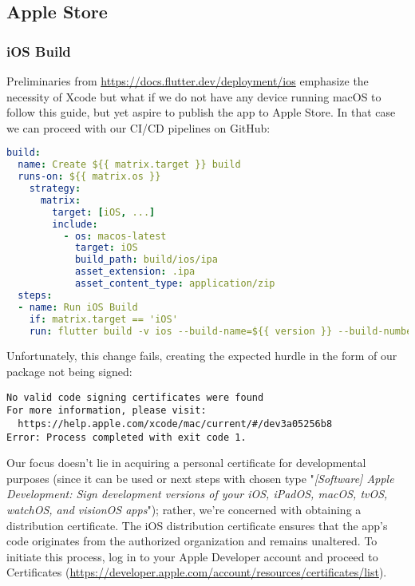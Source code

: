 
\subsection{Apple Store}

\subsubsection{iOS Build}

Preliminaries from \href{https://docs.flutter.dev/deployment/ios}{https://docs.flutter.dev/deployment/ios} emphasize 
the necessity of Xcode but what if we do not have any device running macOS to follow this guide, but yet aspire to 
publish the app to Apple Store. In that case we can proceed with our CI/CD pipelines on GitHub:

\begin{lstlisting}[language=yaml]
build:
  name: Create ${{ matrix.target }} build
  runs-on: ${{ matrix.os }}
    strategy:
      matrix:
        target: [iOS, ...]
        include:
          - os: macos-latest
            target: iOS
            build_path: build/ios/ipa
            asset_extension: .ipa
            asset_content_type: application/zip
  steps:
  - name: Run iOS Build
    if: matrix.target == 'iOS'
    run: flutter build -v ios --build-name=${{ version }} --build-number=${{ number }} --release --no-tree-shake-icons
\end{lstlisting}

\noindent Unfortunately, this change fails, creating the expected hurdle in the form of our package not being signed:

\begin{lstlisting}[language=terminal]
No valid code signing certificates were found
For more information, please visit:
  https://help.apple.com/xcode/mac/current/#/dev3a05256b8
Error: Process completed with exit code 1.
\end{lstlisting}

Our focus doesn't lie in acquiring a personal certificate for developmental purposes (since it can be used 
 or next steps with chosen type "\emph{[Software] Apple Development: Sign 
development versions of your iOS, iPadOS, macOS, tvOS, watchOS, and visionOS apps}"); rather, we're concerned with 
obtaining a distribution certificate. The iOS distribution certificate ensures that the app's code originates from the 
authorized organization and remains unaltered. To initiate this process, log in to your Apple Developer account and 
proceed to Certificates
(\href{https://developer.apple.com/account/resources/certificates/list}{https://developer.apple.com/account/resources/certificates/list}).

